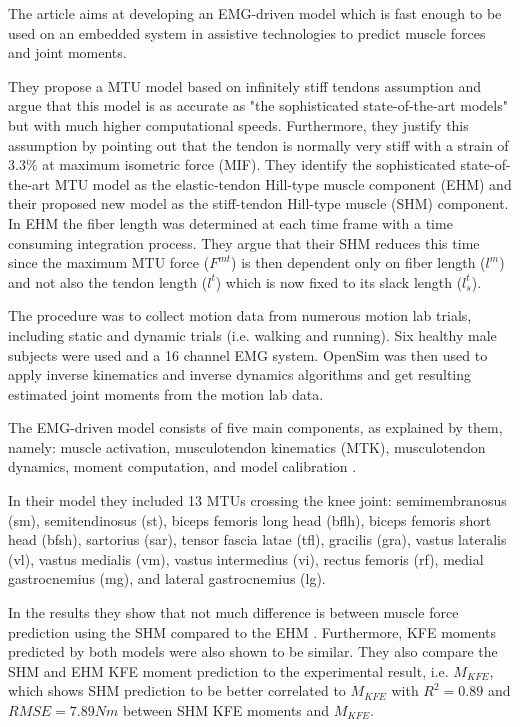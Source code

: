The article aims at developing an EMG-driven model which is fast enough to be used on an embedded system in assistive technologies to predict muscle forces and joint moments.

They propose a MTU model based on infinitely stiff tendons assumption and argue that this model is as accurate as "the sophisticated state-of-the-art models" \cite[p. 2]{Sartori2012} but with much higher computational speeds. Furthermore, they justify this assumption by pointing out that the tendon is normally very stiff with a strain of $3.3\%$ at maximum isometric force (MIF). They identify the sophisticated state-of-the-art MTU model as the elastic-tendon Hill-type muscle component (EHM) and their proposed new model as the stiff-tendon Hill-type muscle (SHM) component. In EHM the fiber length was determined at each time frame with a time consuming integration process. They argue that their SHM reduces this time since the maximum MTU force ($F^{mt}$) is then dependent only on fiber length ($l^m$) and not also the tendon length ($l^t$) which is now fixed to its slack length ($l^t_s$).

The procedure was to collect motion data from numerous motion lab trials, including static and dynamic trials (i.e. walking and running).
Six healthy male subjects were used and a 16 channel EMG system.
OpenSim was then used to apply inverse kinematics and inverse dynamics algorithms and get resulting estimated joint moments from the motion lab data.

The EMG-driven model consists of five main components, as explained by them, namely: muscle activation, musculotendon kinematics (MTK), musculotendon dynamics, moment computation, and model calibration \cite[p. 4]{Sartori2012}.

In their model they included 13 MTUs crossing the knee joint: semimembranosus (sm), semitendinosus (st), biceps femoris long head (bflh), biceps femoris short head (bfsh), sartorius (sar), tensor fascia latae (tfl), gracilis (gra), vastus lateralis (vl), vastus medialis (vm), vastus intermedius (vi), rectus femoris (rf), medial gastrocnemius (mg), and lateral gastrocnemius (lg).

In the results they show that not much difference is between muscle force prediction using the SHM compared to the EHM \cite[Fig. 3]{Sartori2012}. Furthermore, KFE moments predicted by both models were also shown to be similar. They also compare the SHM and EHM KFE moment prediction to the experimental result, i.e. $M_{KFE}$, which shows SHM prediction to be better correlated to $M_{KFE}$ \cite[Fig. 4]{Sartori2012} with $R^2 = 0.89$ and $RMSE = 7.89Nm$ between SHM KFE moments and $M_{KFE}$.

